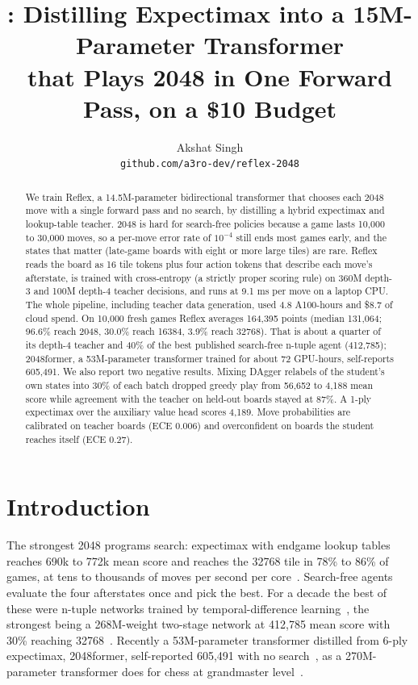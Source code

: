 \documentclass{article}
\title{\method: Distilling Expectimax into a 15M-Parameter Transformer\\that Plays 2048 in One Forward Pass, on a \$10 Budget}
\author{
    Akshat Singh \\
    \texttt{github.com/a3ro-dev/reflex-2048}
}
\newcommand{\method}{Reflex}
\begin{document}
\maketitle

\begin{abstract}
We train \method{}, a 14.5M-parameter bidirectional transformer that chooses each 2048 move with a single forward pass and no search, by distilling a hybrid expectimax and lookup-table teacher.
2048 is hard for search-free policies because a game lasts 10{,}000 to 30{,}000 moves, so a per-move error rate of $10^{-4}$ still ends most games early, and the states that matter (late-game boards with eight or more large tiles) are rare.
\method{} reads the board as 16 tile tokens plus four action tokens that describe each move's afterstate, is trained with cross-entropy (a strictly proper scoring rule) on 360M depth-3 and 100M depth-4 teacher decisions, and runs at 9.1 ms per move on a laptop CPU.
The whole pipeline, including teacher data generation, used 4.8 A100-hours and \$8.7 of cloud spend.
On 10{,}000 fresh games \method{} averages 164{,}395 points (median 131{,}064; 96.6\% reach 2048, 30.0\% reach 16384, 3.9\% reach 32768).
That is about a quarter of its depth-4 teacher and 40\% of the best published search-free n-tuple agent (412{,}785); 2048former, a 53M-parameter transformer trained for about 72 GPU-hours, self-reports 605{,}491.
We also report two negative results.
Mixing DAgger relabels of the student's own states into 30\% of each batch dropped greedy play from 56{,}652 to 4{,}188 mean score while agreement with the teacher on held-out boards stayed at 87\%.
A 1-ply expectimax over the auxiliary value head scores 4{,}189.
Move probabilities are calibrated on teacher boards (ECE 0.006) and overconfident on boards the student reaches itself (ECE 0.27).
\end{abstract}

\section{Introduction}

The strongest 2048 programs search: expectimax with endgame lookup tables reaches 690k to 772k mean score and reaches the 32768 tile in 78\% to 86\% of games, at tens to thousands of moves per second per core~\citep{xue2022macroxue}.
Search-free agents evaluate the four afterstates once and pick the best.
For a decade the best of these were n-tuple networks trained by temporal-difference learning~\citep{szubert2014temporal,jaskowski2016mastering,yeh2016multistage}, the strongest being a 268M-weight two-stage network at 412{,}785 mean score with 30\% reaching 32768~\citep{guei2021optimistic}.
Recently a 53M-parameter transformer distilled from 6-ply expectimax, 2048former, self-reported 605{,}491 with no search~\citep{keisling2025former}, as a 270M-parameter transformer does for chess at grandmaster level~\citep{ruoss2024amortized}.
\end{document}
